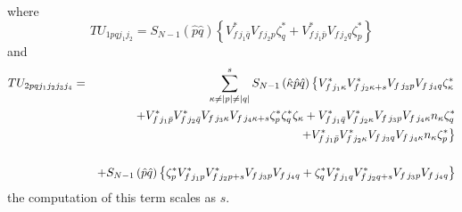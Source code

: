 \documentclass[aps,preprint]{revtex4}
\begin{document}
where 
\begin{equation}
TU_{1pqj_{1}j_{2}}=S_{N-1}\left( \hat{p}\hat{q}\right) \left\{ V_{f\,j_{1}%
\bar{q}}^{\ast }V_{f\,j_{2}p}\zeta _{q}^{\ast }+V_{f\,j_{1}\bar{p}}^{\ast
}V_{f\,j_{2}q}\zeta _{p}^{\ast }\right\} 
\end{equation}%
and 
\begin{eqnarray}
TU_{2pqj_{1}j_{2}j_{3}j_{4}} &=&\sum_{\kappa \neq \left| p\right| \neq
\left| q\right| }^{s}S_{N-1}\left( \hat{\kappa}\hat{p}\hat{q}\right) \left\{
V_{f\,j_{1}\kappa }^{\ast }V_{f\,j_{2}\kappa +s}^{\ast
}V_{f\,j_{3}p}V_{f\,j_{4}q}\zeta _{\kappa }^{\ast }\right.   \notag \\
&&+V_{f\,j_{1}\bar{p}}^{\ast }V_{f\,j_{2}\bar{q}}^{\ast }V_{f\,j_{3}\kappa
}V_{f\,j_{4}\kappa +s}\zeta _{p}^{\ast }\zeta _{q}^{\ast }\zeta _{\kappa
}+V_{f\,j_{1}\bar{q}}^{\ast }V_{f\,j_{2}\kappa }^{\ast
}V_{f\,j_{3}p}V_{f\,j_{4}\kappa }n_{\kappa }\zeta _{q}^{\ast }  \notag \\
&&\qquad \qquad \qquad \qquad \qquad \qquad \qquad \qquad \left. +V_{f\,j_{1}%
\bar{p}}^{\ast }V_{f\,j_{2}\kappa }^{\ast }V_{f\,j_{3}q}V_{f\,j_{4}\kappa
}n_{\kappa }\zeta _{p}^{\ast }\right\}   \notag \\
&&  \notag \\
&&+S_{N-1}\left( \hat{p}\hat{q}\right) \left\{ \zeta _{p}^{\ast
}V_{f\,j_{1}p}^{\ast }V_{f\,j_{2}p+s}^{\ast
}V_{f\,j_{3}p}V_{f\,j_{4}q}+\zeta _{q}^{\ast }V_{f\,j_{1}q}^{\ast
}V_{f\,j_{2}q+s}^{\ast }V_{f\,j_{3}p}V_{f\,j_{4}q}\right\} 
\end{eqnarray}%
the computation of this term scales as $s$. 
\end{document}
